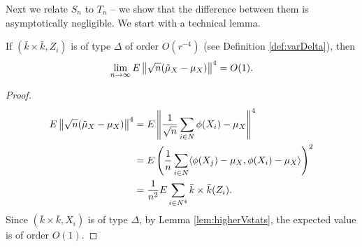 Next we relate $S_n$ to $T_n$ -- we  show that the difference between them is asymptotically negligible. We start with a technical lemma.  
\begin{lemma}
\label{lem:hahaha}
If $(\bar k \times \bar k,Z_i)$  is of type $\varDelta$   of order $O(r^{-4})$ (see Definition \ref{def:varDelta}), then 
$$\lim_{n \to \infty} E \left \| \sqrt n (\tilde  \mu_X  - \mu_X) \right \|^4 = O(1).$$
\end{lemma}
\begin{proof}
 \begin{align*}
   E \left \| \sqrt n (\tilde  \mu_X  -  \mu_X) \right \|^4  &=  E \left \|  \frac {1} {\sqrt n}  \sum_{i \in N} \phi(X_i) - \mu_X  \right\|^4  \\
     &=E  \left( \frac 1 n   \sum_{i \in N} \langle  \phi(X_j) - \mu_X, \phi(X_i) - \mu_X \rangle  \right)^2 \\
   &=\frac{1}{n^2} E  \sum_{i \in N^4} \bar k \times \bar k (Z_i). 
 \end{align*}
 Since $(\bar k \times \bar k, X_i)$  is of type $\varDelta$, by Lemma \ref{lem:higherVstats}, the expected value is of order $O(1)$.
\end{proof}

